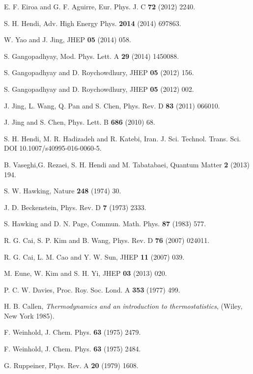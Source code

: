 \documentclass[aps,onecolumn ]{revtex4}
\begin{document}
\begin{thebibliography}{99}
 E. F. Eiroa and G. F. Aguirre, Eur. Phys. J. C \textbf{72} (2012)
2240.

 S. H. Hendi, Adv. High Energy Phys. \textbf{2014} (2014) 697863.

 W. Yao and J. Jing, JHEP \textbf{05} (2014) 058.

 S. Gangopadhyay, Mod. Phys. Lett. A \textbf{29} (2014) 1450088.

 S. Gangopadhyay and D. Roychowdhury, JHEP \textbf{05} (2012) 156.

 S. Gangopadhyay and D. Roychowdhury, JHEP \textbf{05} (2012) 002.

 J. Jing, L. Wang, Q. Pan and S. Chen, Phys. Rev. D \textbf{83}
(2011) 066010.

 J. Jing and S. Chen, Phys. Lett. B \textbf{686} (2010) 68.

 S. H. Hendi, M. R. Hadizadeh and R. Katebi, Iran. J. Sci. Technol. Trans. Sci.
DOI 10.1007/s40995-016-0060-5.

 B. Vaseghi,G. Rezaei, S. H. Hendi and M. Tabatabaei, Quantum
Matter \textbf{2} (2013) 194.

 S. W. Hawking, Nature \textbf{248} (1974) 30.

 J. D. Beckenstein, Phys. Rev. D \textbf{7} (1973)
2333.

 S. Hawking and D. N. Page, Commun. Math. Phys. \textbf{87} (1983)
577.

 R. G. Cai, S. P. Kim and B. Wang, Phys. Rev. D \textbf{76} (2007)
024011.

 R. G. Cai, L. M. Cao and Y. W. Sun, JHEP \textbf{11} (2007)
039.

 M. Eune, W. Kim and S. H. Yi, JHEP \textbf{03} (2013) 020.

 P. C. W. Davies, Proc. Roy. Soc. Lond. A \textbf{353} (1977)
499.

 H. B. Callen, \emph{Thermodynamics and an introduction to
thermostatistics}, (Wiley, New York 1985).

 F. Weinhold, J. Chem. Phys. \textbf{63} (1975)
2479.

 F. Weinhold, J. Chem. Phys. \textbf{63} (1975) 2484.

 G. Ruppeiner, Phys. Rev. A \textbf{20} (1979)
1608.


\end{thebibliography}
\end{document}
